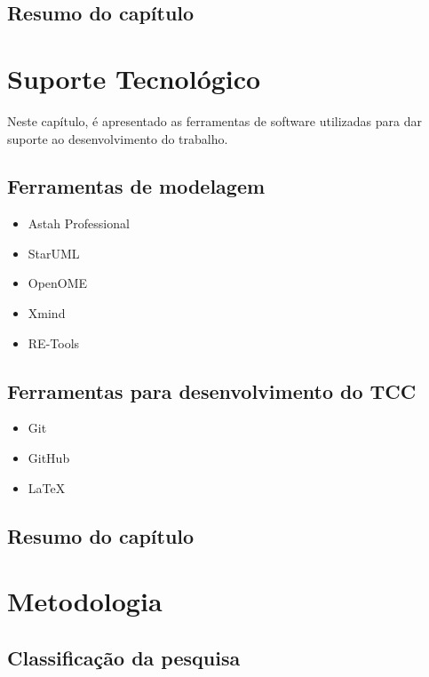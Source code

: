 \section{Resumo do capítulo}


\chapter{Suporte Tecnológico}

Neste capítulo, é apresentado as ferramentas de software utilizadas para dar suporte ao desenvolvimento do trabalho. 

\section{Ferramentas de modelagem}
\label{sec:ferramentasModelagem}

\begin{itemize}
	\item Astah Professional
	\item StarUML
	\item OpenOME
	\item Xmind
	\item RE-Tools
\end{itemize}

\section{Ferramentas para desenvolvimento do TCC}
\label{ferramentasDesenvolvimento}

\begin{itemize}
	\item Git
	\item GitHub
	\item LaTeX 
\end{itemize}

\section{Resumo do capítulo}

\chapter{Metodologia}

\section{Classificação da pesquisa}

